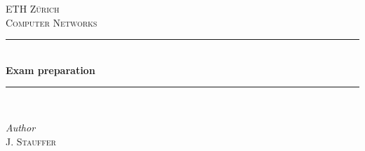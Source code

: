 \begin{titlepage} %
	\newcommand{\HRule}{\rule{\linewidth}{0.5mm}} %
	
	\center %
	
	
	\textsc{\LARGE ETH Zürich}\\[1.5cm] %
	
	\textsc{\Large Computer Networks}\\[0.5cm] %
	
	
	
	\HRule\\[0.4cm]
	
	{\huge\bfseries Exam preparation}\\[0.4cm] %
	
	\HRule\\[1.5cm]
	
	\begin{minipage}{0.4\textwidth}
		\centering
			\large
			\textit{Author}\\
			J. \textsc{Stauffer} \\
	\end{minipage}
	
	
	
	
	\vfill\vfill\vfill %
	

\end{titlepage}
